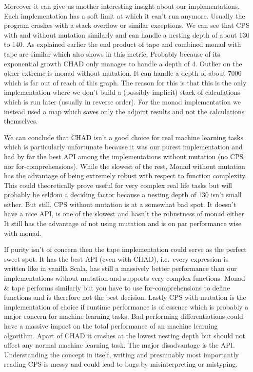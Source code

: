 Moreover it can give us another interesting insight about our implementations. Each implementation has a soft limit at which it can't run anymore. Usually the program crashes with a stack overflow or similar exceptions. We can see that CPS with and without mutation similarly and can handle a nesting depth of about 130 to 140. As explained earlier the end product of tape and combined monad with tape are similar which also shows in this metric. Probably because of its exponential growth CHAD only manages to handle a depth of 4. Outlier on the other extreme is monad without mutation. It can handle a depth of about 7000 which is far out of reach of this graph. The reason for this is that this is the only implementation where we don't build a (possibly implicit) stack of calculations which is run later (usually in reverse order). For the monad implementation we instead used a map which saves only the adjoint results and not the calculations themselves.

We can conclude that CHAD isn't a good choice for real machine learning tasks which is particularly unfortunate because it was our purest implementation and had by far the best API among the implementations without mutation (no CPS nor for-comprehensions). While the slowest of the rest, Monad without mutation has the advantage of being extremely robust with respect to function complexity. This could theoretically prove useful for very complex real life tasks but will probably be seldom a deciding factor because a nesting depth of 130 isn't small either. But still, CPS without mutation is at a somewhat bad spot. It doesn't have a nice API, is one of the slowest and hasn't the robustness of monad either. It still has the advantage of not using mutation and is on par performance wise with monad.

If purity isn't of concern then the tape implementation could serve as the perfect sweet spot. It has the best API (even with CHAD), i.e.\ every expression is written like in vanilla Scala, has still a massively better performance than our implementations without mutation and supports very complex functions. Monad \& tape performs similarly but you have to use for-comprehensions to define functions and is therefore not the best decision. Lastly CPS with mutation is the implementation of choice if runtime performance is of essence which is probably a major concern for machine learning tasks. Bad performing differentiations could have a massive impact on the total performance of an machine learning algorithm. Apart of CHAD it crashes at the lowest nesting depth but should not affect any normal machine learning task. The major disadvantage is the API. Understanding the concept in itself, writing and presumably most importantly reading CPS is messy and could lead to bugs by misinterpreting or mistyping.

